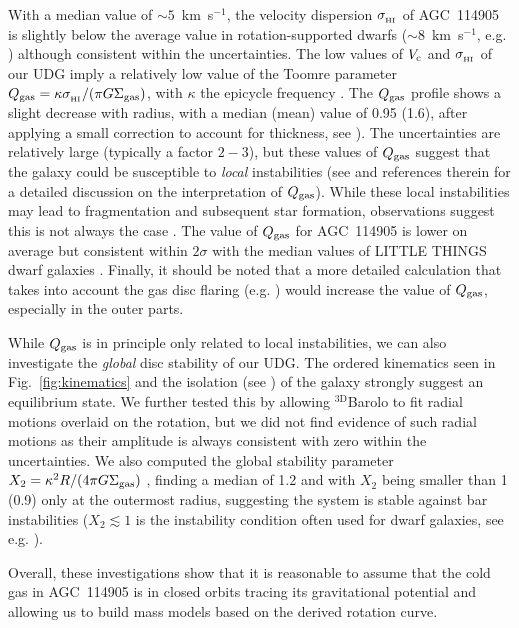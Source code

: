 \documentclass[fleqn,usenatbib]{mnras}
\begin{document}
With a median value of $\sim5$~km~s$^{-1}$, the velocity dispersion $\sigma_{_{\rm HI}}$ of AGC~114905 is slightly below the average value in rotation-supported dwarfs ($\sim 8$~km~s$^{-1}$, e.g. \citealt{iorio}) although consistent within the uncertainties. The low values of $V_{\rm c}$ and $\sigma_{_{\rm HI}}$ of our UDG imply a relatively low value of the Toomre parameter $Q_{\rm gas} = \kappa \sigma_{_{\rm HI}}/(\pi G \Sigma_{\rm gas})$, with $\kappa$ the epicycle frequency \citep{toomre1964}. The $Q_{\rm gas}$ profile shows a slight decrease with radius, with a median (mean) value of 0.95 (1.6), after applying a small correction to account for thickness, see \citealt{romeo1994,romeo2013}). The uncertainties are relatively large (typically a factor $2-3$), but these values of $Q_{\rm gas}$ suggest that the galaxy could be susceptible to \emph{local} instabilities (see \citealt{romeo2013} and references therein for a detailed discussion on the interpretation of $Q_{\rm gas}$). While these local instabilities may lead to fragmentation and subsequent star formation, observations suggest this is not always the case \citep{hunter1998,leroy,elmegreen2015}. The value of $Q_{\rm gas}$ for AGC~114905 is lower on average but consistent within $2\sigma$ with the median values of LITTLE THINGS dwarf galaxies \citep{iorio}. Finally, it should be noted that a more detailed calculation that takes into account the gas disc flaring (e.g. \citealt{elmegreen2015,ceci_dwarfs}) would increase the value of $Q_{\rm gas}$, especially in the outer parts.

While $Q_{\rm gas}$ is in principle only related to local instabilities, we can also investigate the \emph{global} disc stability of our UDG. The ordered kinematics seen in Fig.~\ref{fig:kinematics} and the isolation (see \citealt{huds2020}) of the galaxy strongly suggest an equilibrium state. We further tested this by allowing $\mathrm{^{3D}}$Barolo to fit radial motions overlaid on the rotation, but we did not find evidence of such radial motions as their amplitude is always consistent with zero within the uncertainties. We also computed the global stability parameter $X_2 = \kappa^2 R /(4\pi G \Sigma_{\rm gas})$ \citep{toomre1981}, finding a median of 1.2 and with $X_2$ being smaller than 1 (0.9) only at the outermost radius, suggesting the system is stable against bar instabilities ($X_2 \lesssim 1$ is the instability condition often used for dwarf galaxies, see e.g. \citealt{mihos1997,hidalgo-gamez04}). 

Overall, these investigations show that it is reasonable to assume that the cold gas in AGC~114905 is in closed orbits tracing its gravitational potential and allowing us to build mass models based on the derived rotation curve.
\end{document}
